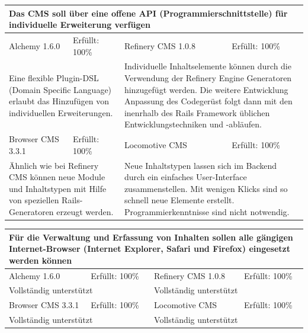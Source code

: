 \begin{tabular}[!ht]{|l|l|l|l|}
\hline
\multicolumn{4}{|p{15cm}|}{\textbf{Das CMS soll über eine offene API (Programmierschnittstelle) für individuelle Erweiterung verfügen}} \\
\hline
  Alchemy 1.6.0 & \cellcolor{green}Erfüllt: 100\% & Refinery CMS 1.0.8 & \cellcolor{green}Erfüllt: 100\% \\
  \hline
  \multicolumn{2}{|p{7.5cm}|}{Eine flexible Plugin-DSL (Domain Specific Language) erlaubt das Hinzufügen von individuellen Erweiterungen.}
   & \multicolumn{2}{p{7.5cm}|}{Individuelle Inhaltselemente können durch die Verwendung der Refinery Engine Generatoren hinzugefügt werden. Die weitere Entwicklung Anpassung des Codegerüst folgt dann mit den inenrhalb des Rails Framework üblichen Entwicklungstechniken und -abläufen.} \\
  \hline
  Browser CMS 3.3.1 & \cellcolor{green}Erfüllt: 100\% & Locomotive CMS & \cellcolor{green}Erfüllt: 100\% \\
  \hline
  \multicolumn{2}{|p{7.5cm}|}{Ähnlich wie bei Refinery CMS können neue Module und Inhaltstypen mit Hilfe von speziellen Rails-Generatoren erzeugt werden.} & \multicolumn{2}{p{7.5cm}|}{Neue Inhaltstypen lassen sich im Backend durch ein einfaches User-Interface zusammenstellen.  Mit wenigen Klicks sind so schnell neue Elemente erstellt. Programmierkenntnisse sind nicht notwendig.} \\
\hline
\end{tabular}
\newline
\newline
\newline
\begin{tabular}[!ht]{|l|l|l|l|}
\hline
\multicolumn{4}{|p{15cm}|}{\textbf{Für die Verwaltung und Erfassung von Inhalten sollen alle gängigen Internet-Browser (Internet Explorer, Safari und Firefox) eingesetzt werden können}} \\
\hline
  Alchemy 1.6.0 & \cellcolor{green}Erfüllt: 100\% & Refinery CMS 1.0.8 & \cellcolor{green}Erfüllt: 100\% \\
  \hline
  \multicolumn{2}{|p{7.5cm}|}{Vollständig unterstützt}
   & \multicolumn{2}{p{7.5cm}|}{Vollständig unterstützt} \\
  \hline
  Browser CMS 3.3.1 & \cellcolor{green}Erfüllt: 100\% & Locomotive CMS & \cellcolor{green}Erfüllt: 100\% \\
  \hline
  \multicolumn{2}{|p{7.5cm}|}{Vollständig unterstützt} & \multicolumn{2}{p{7.5cm}|}{Vollständig unterstützt} \\
\hline
\end{tabular}
